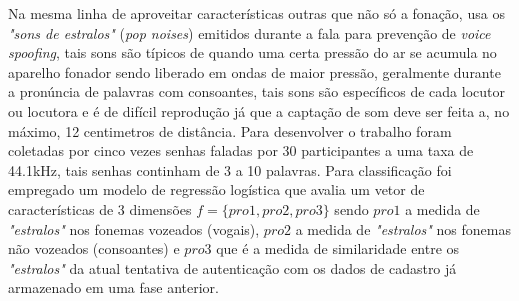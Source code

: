 			\par Na mesma linha de aproveitar características outras que não só a fonação, \cite{9744556} usa os \textit{"sons de estralos"} (\textit{pop noises}) emitidos durante a fala para prevenção de \textit{voice spoofing}, tais sons são típicos de quando uma certa pressão do ar se acumula no aparelho fonador sendo liberado em ondas de maior pressão, geralmente durante a pronúncia de palavras com consoantes, tais sons são específicos de cada locutor ou locutora e é de difícil reprodução já que a captação de som deve ser feita a, no máximo, 12 centimetros de distância. Para desenvolver o trabalho foram coletadas por cinco vezes senhas faladas por 30 participantes a uma taxa de 44.1kHz, tais senhas continham de 3 a 10 palavras. Para classificação foi empregado um modelo de regressão logística que avalia um vetor de características de 3 dimensões $f=\{pro1, pro2, pro3\}$ sendo $pro1$ a medida de \textit{"estralos"} nos fonemas vozeados (vogais), $pro2$ a medida de \textit{"estralos"} nos fonemas não vozeados (consoantes) e $pro3$ que é a medida de similaridade entre os \textit{"estralos"} da atual tentativa de autenticação com os dados de cadastro já armazenado em uma fase anterior.
			
